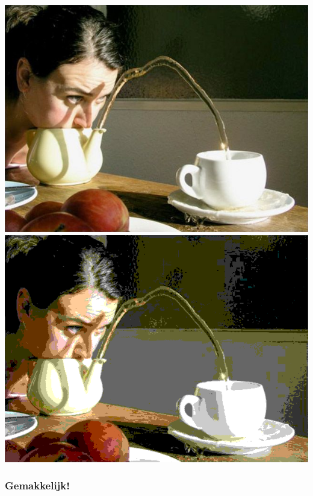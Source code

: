 \documentclass{beamer}
\begin{document}
\begin{frame}
\begin{itemize}
    \begin{center}
      \includegraphics[scale=.2]{../images/41.png}
      \raisebox{.58in}{$\Longrightarrow$}
      \includegraphics[scale=.2]{posterized.png}
    \end{center}
  \end{itemize}
\end{frame}

\begin{frame}[fragile]
  \frametitle{Gemakkelijk!}

  

  \pause

  

\end{frame}
\end{document}
